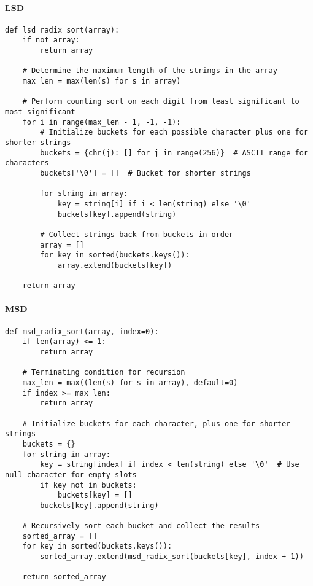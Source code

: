 \documentclass{article}
\begin{document}
\paragraph{LSD}
\begin{verbatim}
def lsd_radix_sort(array):
    if not array:
        return array

    # Determine the maximum length of the strings in the array
    max_len = max(len(s) for s in array)

    # Perform counting sort on each digit from least significant to most significant
    for i in range(max_len - 1, -1, -1):
        # Initialize buckets for each possible character plus one for shorter strings
        buckets = {chr(j): [] for j in range(256)}  # ASCII range for characters
        buckets['\0'] = []  # Bucket for shorter strings
        
        for string in array:
            key = string[i] if i < len(string) else '\0'
            buckets[key].append(string)

        # Collect strings back from buckets in order
        array = []
        for key in sorted(buckets.keys()):
            array.extend(buckets[key])

    return array
\end{verbatim}

\paragraph{MSD}
\begin{verbatim}
def msd_radix_sort(array, index=0):
    if len(array) <= 1:
        return array

    # Terminating condition for recursion
    max_len = max((len(s) for s in array), default=0)
    if index >= max_len:
        return array

    # Initialize buckets for each character, plus one for shorter strings
    buckets = {}
    for string in array:
        key = string[index] if index < len(string) else '\0'  # Use null character for empty slots
        if key not in buckets:
            buckets[key] = []
        buckets[key].append(string)

    # Recursively sort each bucket and collect the results
    sorted_array = []
    for key in sorted(buckets.keys()):
        sorted_array.extend(msd_radix_sort(buckets[key], index + 1))

    return sorted_array
\end{verbatim}
\end{document}
